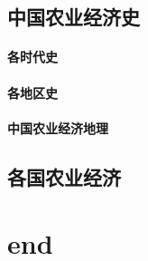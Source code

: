 \documentclass[UTF8]{../../RepresentationUniverse}
\begin{document}
\section{中国农业经济史}
    \subsubsection{各时代史}
    \subsubsection{各地区史}
    \subsubsection{中国农业经济地理}

\section{各国农业经济}




\chapter{end}
\end{document}
